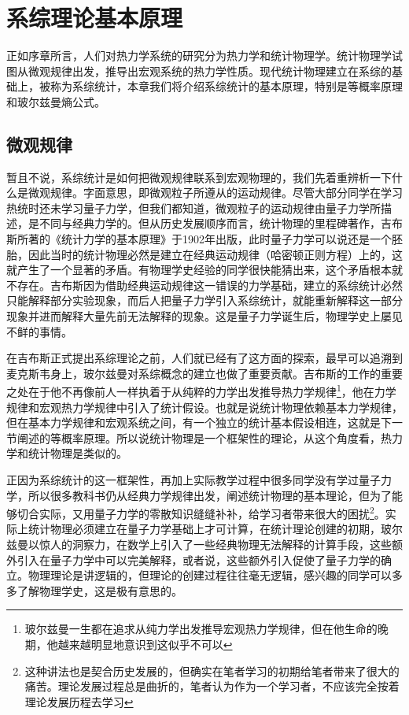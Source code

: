\documentclass[../../main.tex]{subfiles}
\begin{document}
\chapter{系综理论基本原理}
正如序章所言，人们对热力学系统的研究分为热力学和统计物理学。统计物理学试图从微观规律出发，推导出宏观系统的热力学性质。现代统计物理建立在系综的基础上，被称为系综统计，本章我们将介绍系综统计的基本原理，特别是等概率原理和玻尔兹曼熵公式。

\section{微观规律}
暂且不说，系综统计是如何把微观规律联系到宏观物理的，我们先着重辨析一下什么是微观规律。字面意思，即微观粒子所遵从的运动规律。尽管大部分同学在学习热统时还未学习量子力学，但我们都知道，微观粒子的运动规律由量子力学所描述，是不同与经典力学的。但从历史发展顺序而言，统计物理的里程碑著作，吉布斯所著的《统计力学的基本原理》于1902年出版，此时量子力学可以说还是一个胚胎，因此当时的统计物理必然是建立在经典运动规律（哈密顿正则方程）上的，这就产生了一个显著的矛盾。有物理学史经验的同学很快能猜出来，这个矛盾根本就不存在。吉布斯因为借助经典运动规律这一错误的力学基础，建立的系综统计必然只能解释部分实验现象，而后人把量子力学引入系综统计，就能重新解释这一部分现象并进而解释大量先前无法解释的现象。这是量子力学诞生后，物理学史上屡见不鲜的事情。

在吉布斯正式提出系综理论之前，人们就已经有了这方面的探索，最早可以追溯到麦克斯韦身上，玻尔兹曼对系综概念的建立也做了重要贡献。吉布斯的工作的重要之处在于他不再像前人一样执着于从纯粹的力学出发推导热力学规律\footnote{玻尔兹曼一生都在追求从纯力学出发推导宏观热力学规律，但在他生命的晚期，他越来越明显地意识到这似乎不可以}，他在力学规律和宏观热力学规律中引入了统计假设。也就是说统计物理依赖基本力学规律，但在基本力学规律和宏观系统之间，有一个独立的统计基本假设相连，这就是下一节阐述的等概率原理。所以说统计物理是一个框架性的理论，从这个角度看，热力学和统计物理是类似的。

正因为系综统计的这一框架性，再加上实际教学过程中很多同学没有学过量子力学，所以很多教科书仍从经典力学规律出发，阐述统计物理的基本理论，但为了能够切合实际，又用量子力学的零散知识缝缝补补，给学习者带来很大的困扰\footnote{这种讲法也是契合历史发展的，但确实在笔者学习的初期给笔者带来了很大的痛苦。理论发展过程总是曲折的，笔者认为作为一个学习者，不应该完全按着理论发展历程去学习}。实际上统计物理必须建立在量子力学基础上才可计算，在统计理论创建的初期，玻尔兹曼以惊人的洞察力，在数学上引入了一些经典物理无法解释的计算手段，这些额外引入在量子力学中可以完美解释，或者说，这些额外引入促使了量子力学的确立。物理理论是讲逻辑的，但理论的创建过程往往毫无逻辑，感兴趣的同学可以多多了解物理学史，这是极有意思的。
\end{document}
